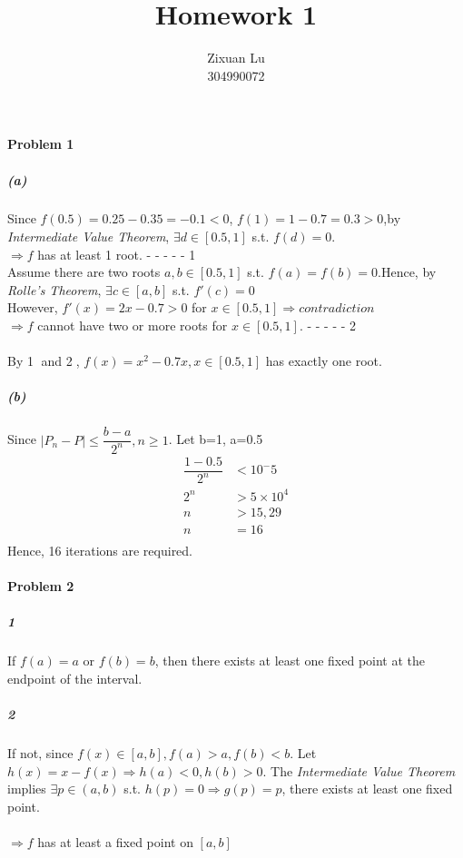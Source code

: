 \documentclass{article}
\author{Zixuan Lu \\ 304990072}
\title{\textbf{Homework 1}}
\begin{document}
\maketitle
\paragraph{Problem 1}
\subparagraph*{(a)} Since $f(0.5)=0.25-0.35=-0.1 < 0$, $f(1)=1-0.7=0.3>0$,by \textit{Intermediate Value Theorem}, $\exists d\in[0.5,1]$ s.t. $f(d)=0$. \\
$\Rightarrow f$ has at least 1 root. - - - - - \textcircled{1}\\


Assume there are two roots  $a,b\in[0.5,1]$ s.t. $f(a)=f(b)=0$.Hence, by \textit{Rolle's Theorem}, $\exists c\in[a,b]$ s.t. ${f}'(c) = 0$ \\
However, ${f}'(x)=2x-0.7>0$ for $x\in[0.5,1] \Rightarrow contradiction$ \\
$\Rightarrow f$ cannot have two or more roots for $x\in[0.5,1]$. - - - - - \textcircled{2}\\ \\
By \textcircled{1} and \textcircled{2}, $f(x)=x^2-0.7x, x\in[0.5,1]$ has exactly one root.
\\
\subparagraph*{(b)} Since $|P_{n}-P|\leq\dfrac{b-a}{2^n},n\geq1$. Let b=1, a=0.5\\
\begin{equation}\nonumber
\begin{split}
\dfrac{1-0.5}{2^n} &< 10^-5 \\
2^n & >5\times10^4 \\
n &> 15,29 \\
n &= 16 \\
\end{split}
\end{equation} 
Hence, 16 iterations are required.
\paragraph{Problem 2}
\subparagraph*{\textcircled{1}} If $f(a)=a$ or $f(b)=b$, then there exists at least one fixed point at the endpoint of the interval.
\subparagraph*{\textcircled{2}} If not, since $f(x)\in[a, b], f(a)>a, f(b)<b$. Let $h(x)=x-f(x) \Rightarrow h(a)<0, h(b)>0$. The \textit{Intermediate Value Theorem} implies $\exists p\in(a,b)$ s.t. $h(p)=0 \Rightarrow g(p)=p$, there exists at least one fixed point. \\
\\
$\Rightarrow f$ has at least a fixed point on $[a,b]$
\newpage
\end{document}
